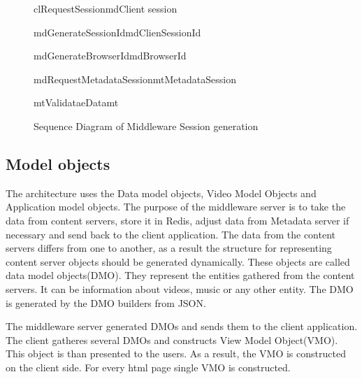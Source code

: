 \begin{figure}[h]
\begin{center}

	\resizebox{1.1\textwidth}{0.5\textwidth} {

	\begin{sequencediagram}

	\begin{call}{cl}{RequestSession}{md}{Client session}

		\begin{call}{md}{GenerateSessionId}{md}{ClienSessionId} \end{call}
		\begin{call}{md}{GenerateBrowserId}{md}{BrowserId} \end{call}
		\begin{call}{md}{RequestMetadataSession}{mt}{MetadataSession} 
			\begin{call}{mt}{ValidataeData}{mt}{}\end{call}
		\end{call}

	\end{call}

	\end{sequencediagram}
	}

\end{center}
\caption{Sequence Diagram of Middleware Session generation}
\label{fig:arch_sess_uml}
\end{figure}


\subsection{Model objects}

The architecture uses the Data model objects, Video Model Objects and Application model objects.
The purpose of the middleware server is to take the data from content servers, store it in Redis, adjust data from Metadata server if necessary and send back to the client application. The data from the content servers differs from one to another, as a result the structure for representing content server objects should be generated dynamically. These objects are called data model objects(DMO). They represent the entities gathered from the content servers. It can be information about videos, music or any other entity. The DMO is generated by the DMO builders from JSON.

The middleware server generated DMOs and sends them to the client application. The client gatheres several DMOs and constructs View Model Object(VMO). This object is than presented to the users. As a result, the VMO is constructed on the client side. For every html page single VMO is constructed. 


